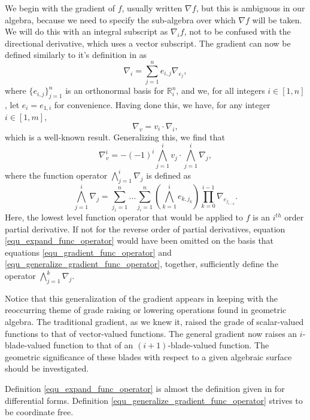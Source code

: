 \documentclass{birkjour}
\theoremstyle{definition}
\theoremstyle{remark}
\numberwithin{equation}{section}
\newcommand{\R}{\mathbb{R}}
\begin{document}
We begin with the gradient of $f$, usually written $\nabla f$, but this is ambiguous in our algebra,
because we need to specify the sub-algebra over which $\nabla f$ will be taken.  We will
do this with an integral subscript as $\nabla_i f$, not to be confused with the directional
derivative, which uses a vector subscript.  The gradient can now be defined similarly to
it's definition in \cite{} as
\begin{equation}\label{equ_gradient_func_operator}
\nabla_i = \sum_{j=1}^n e_{i,j}\nabla_{e_j},
\end{equation}
where $\{e_{i,j}\}_{j=1}^n$ is an orthonormal basis for $\R^n_i$, and
we, for all integers $i\in[1,n]$, let $e_i=e_{1,i}$ for convenience.
Having done this, we have, for any integer $i\in[1,m]$,
\begin{equation*}
\nabla_v = v_i\cdot\nabla_i,
\end{equation*}
which is a well-known result.  Generalizing this, we find that
\begin{equation}\label{equ_generalize_gradient_func_operator}
\nabla_v^i = -(-1)^i\bigwedge_{j=1}^i v_j\cdot\bigwedge_{j=1}^i\nabla_j,
\end{equation}
where the function operator $\bigwedge_{j=1}^i\nabla_j$ is defined as
\begin{equation}\label{equ_expand_func_operator}
\bigwedge_{j=1}^i\nabla_j =
\sum_{j_1=1}^n\dots\sum_{j_i=1}^n\left(\bigwedge_{k=1}^i
e_{k,j_k}\right)\prod_{k=0}^{i-1}\nabla_{e_{j_{i-k}}}.
\end{equation}
Here, the lowest level function operator that would be applied to $f$ is an $i^{th}$ order partial derivative.
If not for the reverse order of partial derivatives, equation \eqref{equ_expand_func_operator}
would have been omitted on
the basis that equations \eqref{equ_gradient_func_operator} and
\eqref{equ_generalize_gradient_func_operator}, together, sufficiently
define the operator $\bigwedge_{j=1}^k\nabla_j$.

Notice that this generalization of the gradient appears in keeping with the reoccurring theme
of grade raising or lowering operations found in geometric algebra.  The traditional gradient,
as we knew it, raised the grade of scalar-valued functions to that of vector-valued functions.
The general gradient now raises an $i$-blade-valued function to that of an $(i+1)$-blade-valued function.
The geometric significance of these blades with respect to a given algebraic surface should be investigated.

Definition \eqref{equ_expand_func_operator} is almost the definition given in \cite{Hestenes93} for
differential forms.  Definition \eqref{equ_generalize_gradient_func_operator} strives to be coordinate free.
\end{document}
